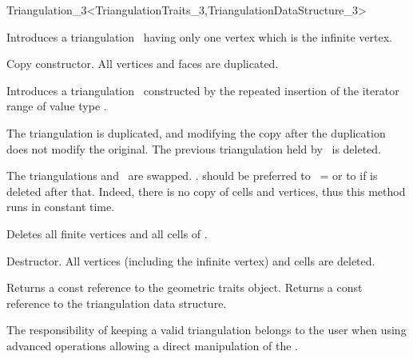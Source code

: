 \begin{ccRefClass}{Triangulation_3<TriangulationTraits_3,TriangulationDataStructure_3>}
{}


\ccCreation
{}  %

\ccThreeToTwo

{Introduces a triangulation \ccVar\ having only one vertex which is the
infinite vertex.} 

{Copy constructor. All vertices and faces are duplicated.}

{Introduces a triangulation \ccVar\ constructed by the repeated insertion
of the iterator range \ccc{[first,last)} of value type .} 


{The triangulation  is duplicated, and modifying the copy after the 
duplication does not modify the original. The previous triangulation held
by \ccVar\ is deleted.}

{The triangulations  and \ccVar\ are swapped.
\ccVar. should be preferred to \ccVar\ =  or to
 if  is deleted after that. Indeed, there is no
copy of cells and vertices, thus this method runs in constant time.}

{Deletes all finite vertices and all cells of \ccVar.}

{Destructor. All vertices (including the infinite vertex) and cells are
deleted.}

\ccAccessFunctions
{}

{Returns a const reference to the geometric traits object.}
\ccGlue
{}
{Returns a const reference to the triangulation data structure.}

\begin{ccAdvanced}
The responsibility of keeping a valid triangulation belongs to the user
when using advanced operations allowing a direct manipulation of the .


\end{ccAdvanced}
\end{ccRefClass}
